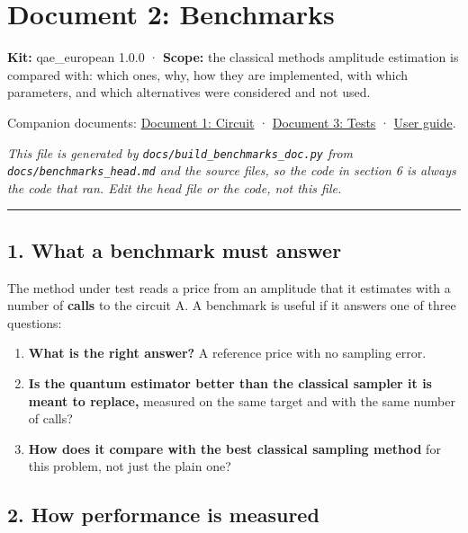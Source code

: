 \documentclass[
  10pt,
]{article}
\author{}
\date{}
\providecommand{\tightlist}{%
  \setlength{\itemsep}{0pt}\setlength{\parskip}{0pt}}
\begin{document}
\hypertarget{document-2-benchmarks}{%
\section{Document 2: Benchmarks}\label{document-2-benchmarks}}

\textbf{Kit:} qae\_european 1.0.0 · \textbf{Scope:} the classical
methods amplitude estimation is compared with: which ones, why, how they
are implemented, with which parameters, and which alternatives were
considered and not used.

Companion documents: \href{circuit.md}{Document 1: Circuit} ·
\href{tests.md}{Document 3: Tests} · \href{../README.md}{User guide}.

\emph{This file is generated by \texttt{docs/build\_benchmarks\_doc.py}
from \texttt{docs/benchmarks\_head.md} and the source files, so the code
in section 6 is always the code that ran. Edit the head file or the
code, not this file.}

\begin{center}\rule{0.5\linewidth}{0.5pt}\end{center}

\hypertarget{1-what-a-benchmark-must-answer}{%
\subsection{1. What a benchmark must
answer}\label{1-what-a-benchmark-must-answer}}

The method under test reads a price from an amplitude that it estimates
with a number of \textbf{calls} to the circuit A. A benchmark is useful
if it answers one of three questions:

\begin{enumerate}
\def\labelenumi{\arabic{enumi}.}
\tightlist
\item
  \textbf{What is the right answer?} A reference price with no sampling
  error.
\item
  \textbf{Is the quantum estimator better than the classical sampler it
  is meant to replace,} measured on the same target and with the same
  number of calls?
\item
  \textbf{How does it compare with the best classical sampling method}
  for this problem, not just the plain one?
\end{enumerate}

\hypertarget{2-how-performance-is-measured}{%
\subsection{2. How performance is
measured}\label{2-how-performance-is-measured}}
\end{document}
